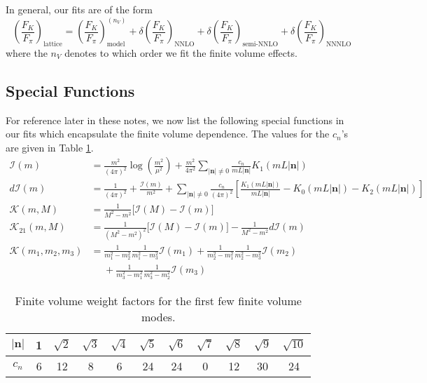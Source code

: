 \documentclass[prd,tightenlines,preprintnumbers,showpacs,superscriptaddress,notitlepage,eqsecnum,floatfix,notitlepage]{revtex4-1}
\begin{document}
In general, our fits are of the form
\begin{equation}
\left(\frac{F_K}{F_\pi}\right)_\text{lattice} = \left(\frac{F_K}{F_\pi}\right)_\text{model}^{(n_V)} +
\delta\left(\frac{F_K}{F_\pi}\right)_\text{NNLO} +
\delta\left(\frac{F_K}{F_\pi}\right)_\text{semi-NNLO} +
\delta\left(\frac{F_K}{F_\pi}\right)_\text{NNNLO}
\end{equation}
where the $n_V$ denotes to which order we fit the finite volume effects.
\subsection{Special Functions}
For reference later in these notes, we now list the following special functions in our fits which encapsulate the finite volume dependence. The values for the $c_n$'s are given in Table \ref{tab:cN_weights}.
\begin{align}
\mathcal{I}(m) &= \frac{m^2}{(4\pi)^2} \log \left( \frac{m^2}{\mu^2} \right)
+ \frac{m^2}{4\pi^2} \sum_{|\mathbf{n}|\neq0} \frac{c_n}{mL|\mathbf{n}|} K_1(mL|\mathbf{n}|) \label{eqn:I(m)} \\
d\mathcal{I}(m) &=
\frac{1}{(4\pi)^2} + \frac{\mathcal{I}(m)}{m^2}
+\sum_{|\mathbf{n}|\neq0} \frac{c_n}{(4\pi)^2} \left[
\frac{K_1(mL|\mathbf{n}|)}{mL|\mathbf{n}|}
-K_0(mL|\mathbf{n}|)
-K_2(mL|\mathbf{n}|)\right] \\
\mathcal{K}(m,M) &= \frac{1}{M^2 - m^2} \Big[ \mathcal{I}(M) - \mathcal{I}(m) \Big] \\
\mathcal{K}_{21}(m,M) &=
\frac{1}{(M^2 - m^2)^2} \Big[ \mathcal{I}(M) - \mathcal{I}(m) \Big]
-\frac{1}{M^2 - m^2} d\mathcal{I}(m) \\
\mathcal{K}(m_1,m_2,m_3) &= \frac{1}{m_1^2 - m_2^2}\frac{1}{m_1^2-m_3^2} \mathcal{I}(m_1)
+\frac{1}{m_2^2 - m_1^2} \frac{1}{m_2^2 - m_3^2} \mathcal{I}(m_2)
\nonumber\\&\phantom{=}
+\frac{1}{m_3^2 - m_1^2} \frac{1}{m_3^2 - m_2^2} \mathcal{I}(m_3)
\end{align}


\begin{table}
	\begin{ruledtabular}
		\begin{tabular}{c|cccccccccc}
			$|\mathbf{n}|$& 1 & $\sqrt{2}$& $\sqrt{3}$& $\sqrt{4}$& $\sqrt{5}$& $\sqrt{6}$& $\sqrt{7}$& $\sqrt{8}$& $\sqrt{9}$& $\sqrt{10}$\\
			\hline
			$c_n$& 6&12& 8& 6& 24& 24& 0& 12& 30& 24
		\end{tabular}
	\end{ruledtabular}
	\caption{\label{tab:cN_weights}
		Finite volume weight factors for the first few finite volume modes.
	}
\end{table}
\end{document}
